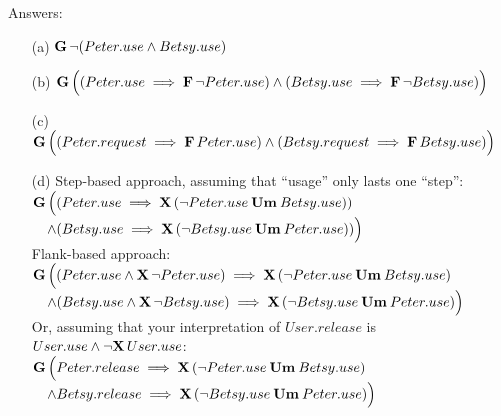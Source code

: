 \documentclass[a4paper,parskip,headheight=38pt]{scrartcl} %
\begin{document}
Answers:
\begin{itemize}
    \item[(a)] $\mathopen{\mathbf{{G}}}\,{} \neg(Peter.use \land Betsy.use)$
    \item[(b)] $\mathopen{\mathbf{{G}}}\,{} \Big( (Peter.use \implies \mathopen{\mathbf{{F}}}\,{} \neg{}Peter.use) \land (Betsy.use \implies \mathopen{\mathbf{{F}}}\,{} \neg{} Betsy.use) \Big)$
    \item[(c)] $\mathopen{\mathbf{{G}}}\,{} \Big( (Peter.request \implies \mathopen{\mathbf{{F}}}\,{} Peter.use) \land (Betsy.request \implies \mathopen{\mathbf{{F}}}\,{} Betsy.use) \Big)$
    \item[(d)] Step-based approach, assuming that \enquote{usage} only lasts one \enquote{step}: \\
               $\mathopen{\mathbf{{G}}}\,{}\Big( (Peter.use \implies \mathopen{\mathbf{{X}}}\,{}(\neg{}Peter.use \mathbin{\mathbf{{Um}}}{} Betsy.use))$ \\
                    \phantom{x} $\quad \land (Betsy.use \implies \mathopen{\mathbf{{X}}}\,{}(\neg{}Betsy.use \mathbin{\mathbf{{Um}}}{} Peter.use)) \Big)$ \\
               Flank-based approach: \\
               $\mathopen{\mathbf{{G}}}\,{}\Big( (Peter.use \land \mathopen{\mathbf{{X}}}\,{} \neg{}Peter.use) \implies \mathopen{\mathbf{{X}}}\,{} (\neg{}Peter.use \mathbin{\mathbf{{Um}}}{} Betsy.use)$ \\
                   \phantom{x} $\quad \land (Betsy.use \land \mathopen{\mathbf{{X}}}\,{} \neg{}Betsy.use) \implies \mathopen{\mathbf{{X}}}\,{} (\neg{}Betsy.use \mathbin{\mathbf{{Um}}}{} Peter.use) \Big)$ \\
               Or, assuming that your interpretation of $User.release$ is $User.use \land \neg{}\mathopen{\mathbf{{X}}}\,{}User.use$: \\
               $\mathopen{\mathbf{{G}}}\,{}\Big( Peter.release \implies \mathopen{\mathbf{{X}}}\,{} (\neg{}Peter.use \mathbin{\mathbf{{Um}}}{} Betsy.use)$ \\
                   \phantom{x} $\quad \land Betsy.release \implies \mathopen{\mathbf{{X}}}\,{} (\neg{}Betsy.use \mathbin{\mathbf{{Um}}}{} Peter.use) \Big)$ \\
\end{itemize}
\end{document}
